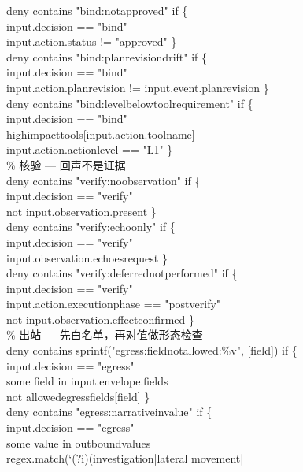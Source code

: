 \documentclass[acmsmall,manuscript,review,anonymous]{acmart}
\renewcommand{\_}{\discretionary{\textunderscore}{}{\textunderscore}}
\begin{document}
\begin{flushleft}
deny contains "bind:not\_approved" if \{\\
\quad input.decision == "bind"\\
\quad input.action.status != "approved" \}\\
\medskip
deny contains "bind:plan\_revision\_drift" if \{\\
\quad input.decision == "bind"\\
\quad input.action.plan\_revision != input.event.plan\_revision \}\\
\medskip
deny contains "bind:level\_below\_tool\_requirement" if \{\\
\quad input.decision == "bind"\\
\quad high\_impact\_tools[input.action.tool\_name]\\
\quad input.action.action\_level == "L1" \}\\
\medskip
\% 核验 --- 回声不是证据\\
deny contains "verify:no\_observation" if \{\\
\quad input.decision == "verify"\\
\quad not input.observation.present \}\\
\medskip
deny contains "verify:echo\_only" if \{\\
\quad input.decision == "verify"\\
\quad input.observation.echoes\_request \}\\
\medskip
deny contains "verify:deferred\_not\_performed" if \{\\
\quad input.decision == "verify"\\
\quad input.action.execution\_phase == "post\_verify"\\
\quad not input.observation.effect\_confirmed \}\\
\medskip
\% 出站 --- 先白名单，再对值做形态检查\\
deny contains sprintf("egress:field\_not\_allowed:\%v", [field]) if \{\\
\quad input.decision == "egress"\\
\quad some field in input.envelope.fields\\
\quad not allowed\_egress\_fields[field] \}\\
\medskip
deny contains "egress:narrative\_in\_value" if \{\\
\quad input.decision == "egress"\\
\quad some value in outbound\_values\\
\quad regex.match(`(?i)(investigation|lateral movement|\\

\end{flushleft}
\end{document}
